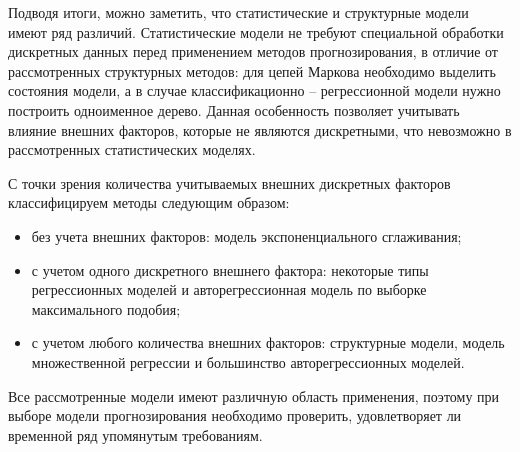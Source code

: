 \begin{table}[h!]
    \caption{Классификация методов прогнозирования временных рядов (часть 2)}
    \label{tab_prog2}
    \centering
\end{table}
\clearpage

Подводя итоги, можно заметить, что статистические и структурные модели имеют ряд различий.
Статистические модели не требуют специальной обработки дискретных данных перед применением методов прогнозирования,
в отличие от рассмотренных структурных методов: для цепей Маркова необходимо выделить состояния модели, а в случае
классификационно -- регрессионной модели нужно построить  одноименное дерево.
Данная особенность позволяет учитывать влияние внешних факторов, которые не являются дискретными, что невозможно в рассмотренных статистических моделях.

С точки зрения количества учитываемых внешних дискретных факторов классифицируем методы следующим образом:
\begin{itemize}
    \item без учета внешних факторов:  модель экспоненциального сглаживания;
    \item с учетом одного дискретного внешнего фактора: некоторые типы регрессионных моделей и авторегрессионная модель по выборке максимального подобия;
    \item с учетом любого количества внешних факторов: структурные модели, модель множественной регрессии и большинство авторегрессионных моделей.
\end{itemize}

Все рассмотренные модели имеют различную область применения, поэтому при выборе модели прогнозирования необходимо проверить,
удовлетворяет ли временной ряд упомянутым требованиям.


